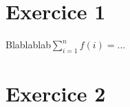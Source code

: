 \documentclass{article}
\begin{document}
\section{Exercice 1}
	Blablablab$\sum_{i=1}^n f(i) = ...$

\section{Exercice 2}
\end{document}
